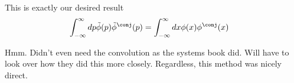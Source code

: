 \documentclass{article}
\newcommand{\Iinf}[1]{ \int_{-\infty}^\infty {#1}}
\begin{document}
This is exactly our desired result
\begin{align*}
\Iinf{ dp \tilde{\phi}(p){\tilde{\phi}}^\conj(p) } &= 
\Iinf{ dx \phi(x) \phi^\conj(x)}
\end{align*}

Hmm.  Didn't even need the convolution as the systems book did.  Will have to look over how they did this more closely.  Regardless, this method was nicely direct.



\end{document}
